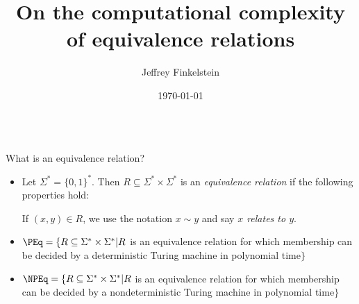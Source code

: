 \documentclass[final]{beamer}
\title{On the computational complexity of equivalence relations}
\author{Jeffrey Finkelstein}
\institute{Tufts University}
\date{\today}
\newcommand{\sigmastar}{\Sigma^*}
\begin{document}
\begin{frame}{} 
  \begin{columns}[t]
    \begin{column}{.3\linewidth}

      \begin{block}{\LARGE What is an equivalence relation?}
        \Large
        \begin{itemize}
        \item Let $\sigmastar=\{0,1\}^*$. Then
          $R\subseteq\sigmastar\times\sigmastar$ is an \emph{equivalence
          relation} if the following properties hold:
          If $(x,y)\in R$, we use the notation $x\sim y$ and say \emph{$x$
            relates to $y$}.
        \item $\PEq=\{R\subseteq\sigmastar\times\sigmastar|R$ is an
          equivalence relation for which membership can be decided by a
          deterministic Turing machine in polynomial time$\}$
        \item $\NPEq=\{R\subseteq\sigmastar\times\sigmastar|R$ is an
          equivalence relation for which membership can be decided by a
          nondeterministic Turing machine in polynomial time$\}$
        \end{itemize}
      \end{block}


\end{column}
\end{columns}
\end{frame}
\end{document}
